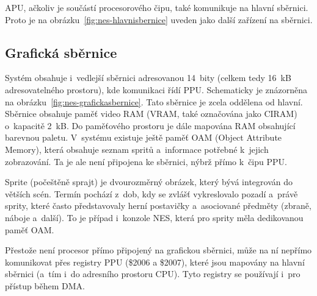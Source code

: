 \begin{note}
	APU, ačkoliv je součástí procesorového čipu, také komunikuje na hlavní sběrnici. Proto je na obrázku~\ref{fig:nes-hlavnisbernice} uveden jako další zařízení na sběrnici.
\end{note}

\subsection{Grafická sběrnice}
Systém obsahuje i~vedlejší sběrnici adresovanou 14~bity (celkem tedy 16~kB adresovatelného prostoru), kde komunikaci řídí PPU. Schematicky je znázorněna na obrázku~\ref{fig:nes-grafickasbernice}. Tato sběrnice je zcela oddělena od hlavní. Sběrnice obsahuje paměť video RAM (VRAM, také označována jako CIRAM) o~kapacitě 2~kB. Do paměťového prostoru je dále mapována RAM obsahující barevnou paletu. V~systému existuje ještě paměť OAM (Object Attribute Memory), která obsahuje seznam spritů a~informace potřebné k~jejich zobrazování. Ta je ale není připojena ke sběrnici, nýbrž přímo k~čipu PPU.

\begin{definition}[Sprite]
	Sprite (počeštěně sprajt) je dvourozměrný obrázek, který bývá integrován do větších scén. Termín pochází z~dob, kdy se zvlášť vykreslovalo pozadí a~právě sprity, které často představovaly herní postavičky a~asociované předměty (zbraně, náboje a~další). To je případ i~konzole NES, která pro sprity měla dedikovanou paměť OAM.
\end{definition}

\begin{note}
	Přestože není procesor přímo připojený na grafickou sběrnici, může na ní nepřímo komunikovat přes registry PPU (\$2006 a \$2007), které jsou mapovány na hlavní sběrnici (a~tím i~do adresního prostoru CPU). Tyto registry se používají i~pro přístup během DMA.
\end{note}

